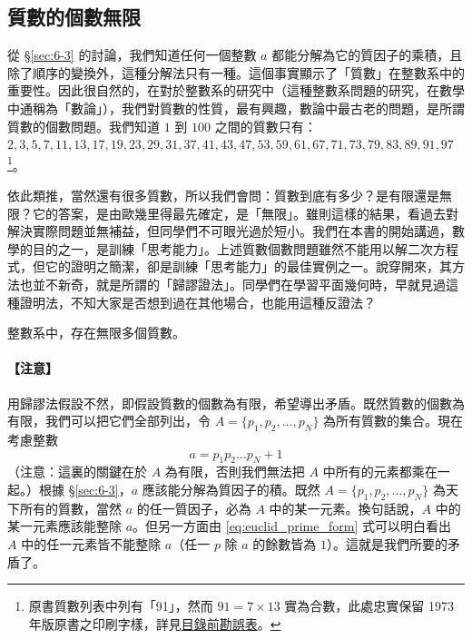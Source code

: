 \subsection{質數的個數無限}\label{sec:6-4}

從 \S\ref{sec:6-3} 的討論，我們知道任何一個整數 $a$ 都能分解為它的質因子的乘積，且除了順序的變換外，這種分解法只有一種。這個事實顯示了「質數」在整數系中的重要性。因此很自然的，在對於整數系的研究中（這種整數系問題的研究，在數學中通稱為「數論」），我們對質數的性質，最有興趣，數論中最古老的問題，是所謂質數的個數問題。我們知道 $1$ 到 $100$ 之間的質數只有：$2, 3, 5, 7, 11, 13, 17, 19, 23, 29, 31, 37, 41, 43, 47, 53, 59, 61, 67, 71, 73, 79, 83, 89, 91, 97$\footnote{原書質數列表中列有「91」，然而 $91 = 7 \times 13$ 實為合數，此處忠實保留 1973 年版原書之印刷字樣，詳見\hyperref[sec:master_errata_notes]{目錄前勘誤表}。}\label{note:ch6-prime91}。

依此類推，當然還有很多質數，所以我們會問：質數到底有多少？是有限還是無限？它的答案，是由歐幾里得最先確定，是「無限」。雖則這樣的結果，看過去對解決實際問題並無補益，但同學們不可眼光過於短小。我們在本書的開始講過，數學的目的之一，是訓練「思考能力」。上述質數個數問題雖然不能用以解二次方程式，但它的證明之簡潔，卻是訓練「思考能力」的最佳實例之一。說穿開來，其方法也並不新奇，就是所謂的「歸謬證法」。同學們在學習平面幾何時，早就見過這種證明法，不知大家是否想到過在其他場合，也能用這種反證法？

\begin{theorem}\label{thm:infinite_primes}
整數系中，存在無限多個質數。
\end{theorem}

\paragraph{【注意】}
用歸謬法假設不然，即假設質數的個數為有限，希望導出矛盾。既然質數的個數為有限，我們可以把它們全部列出，令 $A = \{p_1, p_2, \dots, p_N\}$ 為所有質數的集合。現在考慮整數
\begin{equation}
  a = p_1 p_2 \dots p_N + 1 \label{eq:euclid_prime_form}
\end{equation}
（注意：這裏的關鍵在於 $A$ 為有限，否則我們無法把 $A$ 中所有的元素都乘在一起。）根據 \S\ref{sec:6-3}，$a$ 應該能分解為質因子的積。既然 $A = \{p_1, p_2, \dots, p_N\}$ 為天下所有的質數，當然 $a$ 的任一質因子，必為 $A$ 中的某一元素。換句話說，$A$ 中的某一元素應該能整除 $a$。但另一方面由 \eqref{eq:euclid_prime_form} 式可以明白看出 $A$ 中的任一元素皆不能整除 $a$（任一 $p$ 除 $a$ 的餘數皆為 $1$）。這就是我們所要的矛盾了。
